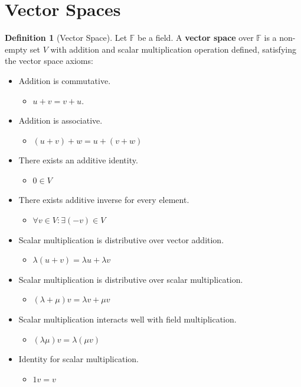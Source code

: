 \documentclass[12pt, a4paper]{article}
\theoremstyle{remark}
\theoremstyle{definition}
\newtheorem{definition}{Definition}
\numberwithin{equation}{section}
\numberwithin{definition}{section}
\numberwithin{example}{section}
\numberwithin{exercise}{section}
\numberwithin{remark}{section}
\numberwithin{figure}{section}
\begin{document}
\section{Vector Spaces}
\begin{definition}[Vector Space]
    Let $\mathbb{F}$ be a field. A \textbf{vector space} over $\mathbb{F}$ is a non-empty set $V$ with
    addition and scalar multiplication operation defined, satisfying the vector space axioms:
    \begin{itemize}
        \item Addition is commutative.
            \begin{itemize}
                \item $u + v = v + u$.
            \end{itemize}
        \item Addition is associative.
            \begin{itemize}
                \item $\left( u + v \right) + w = u + \left( v + w \right)$
            \end{itemize}
        \item There exists an additive identity.
            \begin{itemize}
                \item $0 \in V$
            \end{itemize}
        \item There exists additive inverse for every element.
            \begin{itemize}
                \item $\forall v \in V: \exists (-v) \in V$
            \end{itemize}
        \item Scalar multiplication is distributive over vector addition.
            \begin{itemize}
                \item $\lambda \left( u + v \right) = \lambda u + \lambda v$
            \end{itemize}
        \item Scalar multiplication is distributive over scalar multiplication.
            \begin{itemize}
                \item $\left( \lambda + \mu \right) v = \lambda v + \mu v$
            \end{itemize}
        \item Scalar multiplication interacts well with field multiplication.
            \begin{itemize}
                \item $\left( \lambda \mu \right) v = \lambda \left( \mu v \right)$
            \end{itemize}
        \item Identity for scalar multiplication.
            \begin{itemize}
                \item $1v = v$
            \end{itemize}
    \end{itemize}
\end{definition}
\end{document}
